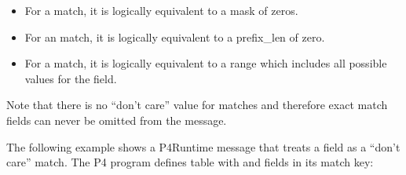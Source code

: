 \documentclass[11pt]{article}
\begin{document}
{%
\begin{itemize}%

\item{}
For a  match, it is logically equivalent to a mask of zeros.%

\item{}
For an  match, it is logically equivalent to a prefix\_len of zero.%

\item{}
For a  match, it is logically equivalent to a range which includes all
possible values for the field.%
\end{itemize}%

\noindent{}Note that there is no \textquotedblleft{}don't care\textquotedblright{} value for  matches and therefore exact
match fields can never be omitted from the  message.%

The following example shows a P4Runtime message that treats a  field
as a \textquotedblleft{}don't care\textquotedblright{} match. The P4 program defines table  with 
and  fields in its match key:%

}
\end{document}
